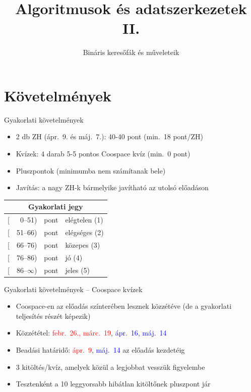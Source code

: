 \documentclass{beamer}
\institute{Szegedi Tudományegyetem}
\title{Algoritmusok és adatszerkezetek II.}
\subtitle{Bináris keresőfák és műveleteik}
\date{}
\begin{document}
\maketitle

\section{Követelmények}

\begin{frame}{Gyakorlati követelmények}
	\begin{itemize}
		\item 2 db ZH (ápr.~9. és máj.~7.): 40-40 pont (min.~18 pont/ZH)
		\item Kvízek: 4 darab 5-5 pontos Coospace kvíz (min.~0 pont)
		\item Pluszpontok (minimumba nem számítanak bele)
		\item Javítás: a nagy ZH-k bármelyike javítható az utolsó előadáson
	\end{itemize}
	\pause
	\begin{table}
	\centering
	\begin{tabular}{r@{}r@{ }l|l}
		\multicolumn{4}{c}{Gyakorlati jegy} \\ \hline
		{[}&0--51)  & pont & elégtelen (1) \\
		{[}&51--66) & pont & elégséges (2) \\
		{[}&66--76) & pont & közepes (3) \\
		{[}&76--86) & pont & jó (4) \\
		{[}&86--$\infty$) & pont & jeles (5)
	\end{tabular}
    \end{table}
\end{frame}

\begin{frame}{Gyakorlati követelmények -- Coospace kvízek}
	\begin{itemize}
		\item Coospace-en az előadás színterében lesznek közzétéve (de a gyakorlati teljesítés részét képezik)
		\item Közzététel: \textcolor{red}{febr.~26., márc.~19}, \textcolor{blue}{ápr.~16, máj.~14}
		\item Beadási határidő: \textcolor{red}{ápr.~9}, \textcolor{blue}{máj.~14} az előadás kezdetéig
		\item 3 kitöltés/kvíz, amelyek közül a legjobbat vesszük figyelembe
		\pause
		\item Tesztenként a 10 leggyorsabb hibátlan kitöltőnek pluszpont jár
	\end{itemize}
\end{frame}
\end{document}
